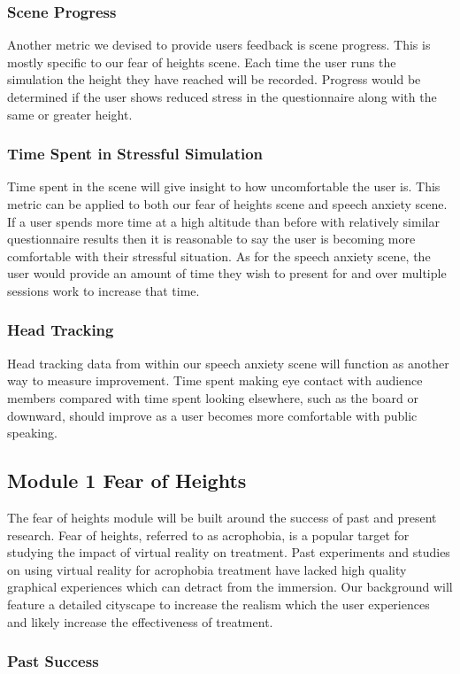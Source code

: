 \documentclass[a4paper,10pt]{article}
\begin{document}
\subsubsection{Scene Progress}
Another metric we devised to provide users feedback is scene progress. This is mostly specific to our fear of heights scene. Each time the user runs the simulation the height they have reached will be recorded. Progress would be determined if the user shows reduced stress in the questionnaire along with the same or greater height.
\subsubsection{Time Spent in Stressful Simulation}
Time spent in the scene will give insight to how uncomfortable the user is. This metric can be applied to both our fear of heights scene and speech anxiety scene. If a user spends more time at a high altitude than before with relatively similar questionnaire results then it is reasonable to say the user is becoming more comfortable with their stressful situation. As for the speech anxiety scene, the user would provide an amount of time they wish to present for and over multiple sessions work to increase that time.
\subsubsection{Head Tracking}
Head tracking data from within our speech anxiety scene will function as another way to measure improvement. Time spent making eye contact with audience members compared with time spent looking elsewhere, such as the board or downward, should improve as a user becomes more comfortable with public speaking.


\pagebreak
\subsection{Module 1 Fear of Heights}
The fear of heights module will be built around the success of past and present research. Fear of heights, referred to as acrophobia, is a popular target for studying the impact of virtual reality on treatment. Past experiments and studies on using virtual reality for acrophobia treatment have lacked high quality graphical experiences which can detract from the immersion. Our background will feature a detailed cityscape to increase the realism which the user experiences and likely increase the effectiveness of treatment.

\subsubsection{Past Success}
\end{document}
